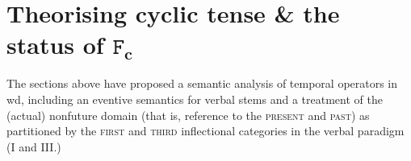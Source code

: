 %
%
%





\section{Theorising cyclic tense \& the status of $ \mathbf{\mathtt{F}_c} $}\label{sec:cyc-theory}

The sections above have proposed a semantic analysis of temporal operators in \gls{wd}, including an eventive semantics for verbal stems and a treatment of the (actual) nonfuture domain (that is, reference to the \textsc{present} and \textsc{past}) as partitioned by the \textsc{first} and \textsc{third} inflectional categories in the verbal paradigm (\gls{I} and \gls{III}.)

